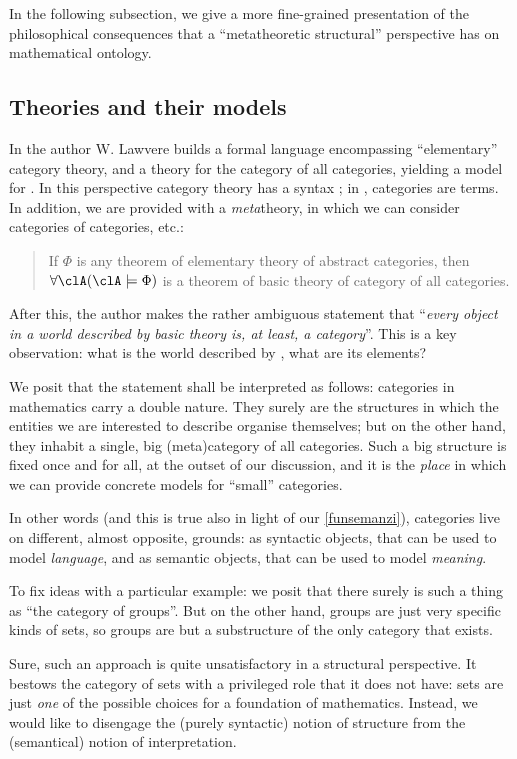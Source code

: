 In the following subsection, we give a more fine-grained presentation of the philosophical consequences that a ``metatheoretic structural'' perspective has on mathematical ontology.
\subsection{Theories and their models}
In \cite{lajolla} the author W. Lawvere builds a formal language  encompassing ``elementary'' category theory, and a theory  for the category of all categories, yielding a model for . In this perspective category theory has a syntax \CT; in \CT, categories are terms. In addition, we are provided with a \emph{meta}theory, in which we can consider categories of categories, etc.:
\begin{quote}
	If $\Phi$ is any theorem of elementary theory of abstract categories, then $\forall \clA (\clA \models \Phi)$ is a theorem of basic theory of category of all categories. \hfill \cite{lajolla}
\end{quote}
After this, the author makes the rather ambiguous statement that ``\textit{every object in a world described by basic theory is, at least, a category}''. This is a key observation: what is the world described by , what are its elements?

We posit that the statement shall be interpreted as follows: categories in mathematics carry a double nature. They surely are the structures in which the entities we are interested to describe organise themselves; but on the other hand, they inhabit a single, big (meta)category of all categories. Such a big structure is fixed once and for all, at the outset of our discussion, and it is the \emph{place} in which we can provide concrete models for ``small'' categories.

In other words (and this is true also in light of our \autoref{funsemanzi}), categories live on different, almost opposite, grounds: as syntactic objects, that can be used to model \emph{language}, and as semantic objects, that can be used to model \emph{meaning}.

To fix ideas with a particular example: we posit that there surely is such a thing as ``the category of groups''. But on the other hand, groups are just very specific kinds of sets, so groups are but a substructure of the only category that exists.

Sure, such an approach is quite unsatisfactory in a structural perspective. It bestows the category of sets with a privileged role that it does not have: sets are just \emph{one} of the possible choices for a foundation of mathematics. Instead, we would like to disengage the (purely syntactic) notion of structure from the (semantical) notion of interpretation.

